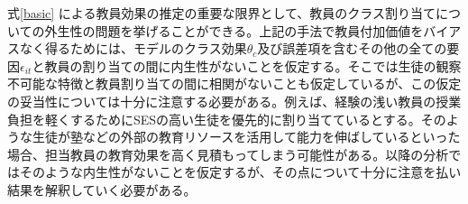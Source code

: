 \documentclass[a4paper,12pt]{article}
\begin{document}


式\ref{basic} による教員効果の推定の重要な限界として、教員のクラス割り当てについての外生性の問題を挙げることができる。上記の手法で教員付加価値をバイアスなく得るためには、モデルのクラス効果$\theta_c$及び誤差項を含むその他の全ての要因$\epsilon_{it}$と教員の割り当ての間に内生性がないことを仮定する。そこでは生徒の観察不可能な特徴と教員割り当ての間に相関がないことも仮定しているが、この仮定の妥当性については十分に注意する必要がある。例えば、経験の浅い教員の授業負担を軽くするためにSESの高い生徒を優先的に割り当てているとする。そのような生徒が塾などの外部の教育リソースを活用して能力を伸ばしているといった場合、担当教員の教育効果を高く見積もってしまう可能性がある。以降の分析ではそのような内生性がないことを仮定するが、その点について十分に注意を払い結果を解釈していく必要がある。
 
\end{document}
